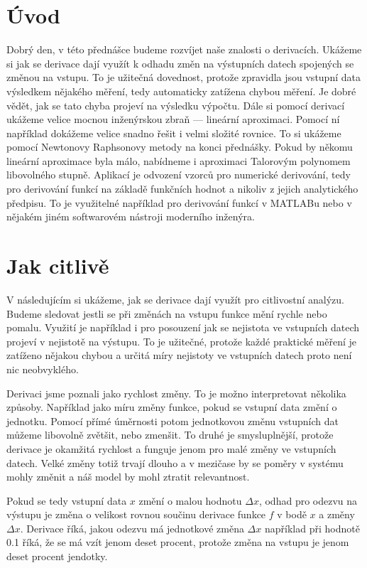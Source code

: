 \documentclass[12pt]{article}
\begin{document}
\section*{Úvod}

Dobrý den, v této přednášce budeme rozvíjet naše znalosti o derivacích. Ukážeme si jak se derivace dají využít k odhadu změn na výstupních datech spojených se změnou na vstupu. To je užitečná dovednost, protože zpravidla jsou vstupní data výsledkem nějakého měření, tedy automaticky zatížena chybou měření. Je dobré vědět, jak se tato chyba projeví na výsledku výpočtu. Dále si pomocí derivací ukážeme velice mocnou inženýrskou zbraň --- lineární aproximaci. Pomocí ní například dokážeme velice snadno řešit i velmi složité rovnice. To si ukážeme pomocí Newtonovy Raphsonovy metody na konci přednášky. Pokud by někomu lineární aproximace byla málo, nabídneme i aproximaci Talorovým polynomem libovolného stupně. Aplikací je odvození vzorců pro numerické derivování, tedy pro derivování funkcí na základě funkčních hodnot a nikoliv z jejich analytického předpisu. To je využitelné například pro derivování funkcí v MATLABu nebo v nějakém jiném softwarovém nástroji moderního inženýra. 

\section*{Jak citlivě}

V následujícím si ukážeme, jak se derivace dají využít pro citlivostní analýzu. Budeme sledovat jestli se při změnách na vstupu funkce mění rychle nebo pomalu. Využití je například i pro posouzení jak se nejistota ve vstupních datech projeví v nejistotě na výstupu. To je užitečné, protože každé praktické měření je zatíženo nějakou chybou a určitá míry nejistoty ve vstupních datech proto není nic neobvyklého.

Derivaci jsme poznali jako rychlost změny. To je možno interpretovat několika způsoby. Například jako míru změny funkce, pokud se vstupní data změní o jednotku. Pomocí přímé úměrnosti potom jednotkovou změnu vstupních dat můžeme libovolně zvětšit, nebo zmenšit. To druhé je smysluplnější, protože derivace je okamžitá rychlost a funguje jenom pro malé změny ve vstupních datech. Velké změny totiž trvají dlouho a v mezičase by se poměry v systému mohly změnit a náš model by mohl ztratit relevantnost. 

Pokud se tedy vstupní data $x$ změní o malou hodnotu $\Delta x$, odhad pro odezvu na výstupu je změna o velikost rovnou součinu derivace funkce $f$ v bodě $x$ a změny $\Delta x$. Derivace říká, jakou odezvu má jednotkové změna $\Delta x$ například při hodnotě 0.1 říká, že se má vzít jenom deset procent, protože změna na vstupu je jenom deset procent jendotky.
\end{document}
